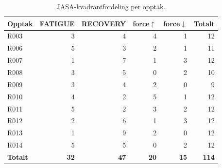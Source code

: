 \begin{table}[ht]
  \centering
  \caption{JASA-kvadrantfordeling per opptak.}
  \label{tab:jasa_per_recording}
  \begin{tabular}{lrrrrr}
    \toprule
    Opptak & FATIGUE & RECOVERY & force$\uparrow$ & force$\downarrow$ & Totalt \\
    \midrule
    R003 & 3 & 4 & 4 & 1 & 12 \\
    R006 & 5 & 3 & 2 & 1 & 11 \\
    R007 & 1 & 7 & 1 & 3 & 12 \\
    R008 & 3 & 5 & 0 & 2 & 10 \\
    R009 & 3 & 4 & 2 & 0 &  9 \\
    R010 & 4 & 2 & 5 & 1 & 12 \\
    R011 & 5 & 2 & 3 & 2 & 12 \\
    R012 & 2 & 6 & 1 & 3 & 12 \\
    R013 & 1 & 9 & 2 & 0 & 12 \\
    R014 & 5 & 5 & 0 & 2 & 12 \\
    \midrule
    \textbf{Totalt} & \textbf{32} & \textbf{47} & \textbf{20} & \textbf{15} & \textbf{114} \\
    \bottomrule
  \end{tabular}
\end{table}
